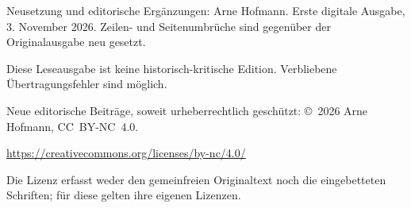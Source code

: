 Neusetzung und editorische Ergänzungen: Arne Hofmann.
Erste digitale Ausgabe, 3. November 2026.
Zeilen- und Seitenumbrüche sind gegenüber der Originalausgabe neu gesetzt.
\par
Diese Leseausgabe ist keine historisch-kritische Edition.
Verbliebene Übertragungsfehler sind möglich.
\par
Neue editorische Beiträge, soweit urheberrechtlich geschützt:
\copyright\ 2026 Arne Hofmann, \mbox{CC BY-NC 4.0}.
\par
\url{https://creativecommons.org/licenses/by-nc/4.0/}
\par
Die Lizenz erfasst weder den gemeinfreien Originaltext noch die eingebetteten
Schriften; für diese gelten ihre eigenen Lizenzen.
